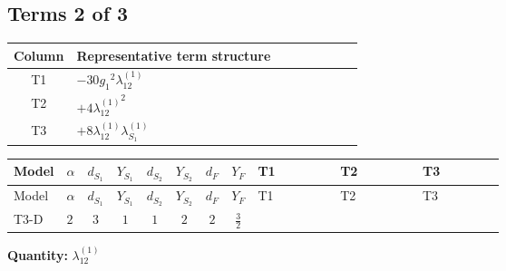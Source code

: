 \documentclass[8pt]{article}
\begin{document}
\begin{landscape}
\subsection*{Terms 2 of 3}
\begin{center}
\begin{tabular}{@{}c >{\raggedright\arraybackslash}p{0.82\linewidth}@{}}
\toprule
Column & Representative term structure \\
\midrule
T1 & \(\displaystyle -30 {g_1}^2 {\lambda_{12}^{(1)}}\) \\
\midrule
T2 & \(\displaystyle +4 {\lambda_{12}^{(1)}}^2\) \\
\midrule
T3 & \(\displaystyle +8 {\lambda_{12}^{(1)}} {\lambda_{S_1}^{(1)}}\) \\
\midrule
\bottomrule
\end{tabular}
\end{center}
\smallskip
\tiny
\begin{longtable}{@{}llcccccc >{\raggedright\arraybackslash}p{0.21\linewidth} >{\raggedright\arraybackslash}p{0.21\linewidth} >{\raggedright\arraybackslash}p{0.21\linewidth}@{}}
\toprule
Model & $\alpha$ & $d_{S_1}$ & $Y_{S_1}$ & $d_{S_2}$ & $Y_{S_2}$ & $d_F$ & $Y_F$ & T1 & T2 & T3 \\
\midrule
\endfirsthead
\toprule
Model & $\alpha$ & $d_{S_1}$ & $Y_{S_1}$ & $d_{S_2}$ & $Y_{S_2}$ & $d_F$ & $Y_F$ & T1 & T2 & T3 \\
\midrule
\endhead
T3-D & $2$ & $3$ & $1$ & $1$ & $2$ & $2$ & $\frac{3}{2}$ & \scriptsize\adjustbox{max width=\linewidth}{$\begin{gathered} -30 {g_1}^2 {\lambda_{12}^{(1)}}\end{gathered}$} & \scriptsize\adjustbox{max width=\linewidth}{$\begin{gathered} +4 {\lambda_{12}^{(1)}}^2\end{gathered}$} & \scriptsize\adjustbox{max width=\linewidth}{$\begin{gathered} +8 {\lambda_{12}^{(1)}} {\lambda_{S_1}^{(1)}}\end{gathered}$} \\
\midrule
\bottomrule
\end{longtable}
\clearpage
\noindent\textbf{Quantity: }$\lambda_{12}^{(1)}$\par\smallskip

\end{landscape}
\end{document}
